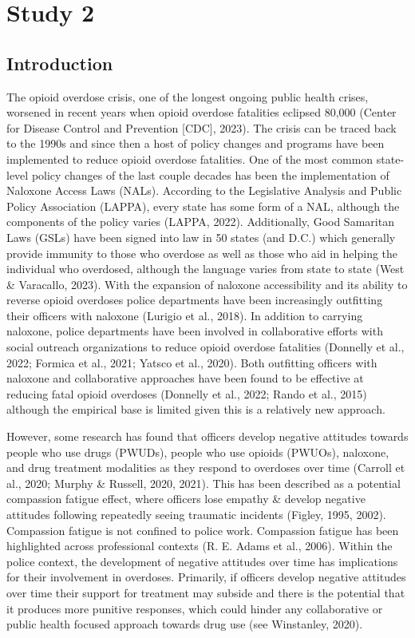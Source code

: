 \chapter{Study 2}

\section{Introduction}

The opioid overdose crisis, one of the longest ongoing public health crises, worsened in recent years when opioid overdose fatalities eclipsed 80,000 (Center for Disease Control and Prevention [CDC], 2023). The crisis can be traced back to the 1990s and since then a host of policy changes and programs have been implemented to reduce opioid overdose fatalities. One of the most common state-level policy changes of the last couple decades has been the implementation of Naloxone Access Laws (NALs). According to the Legislative Analysis and Public Policy Association (LAPPA), every state has some form of a NAL, although the components of the policy varies (LAPPA, 2022). Additionally, Good Samaritan Laws (GSLs) have been signed into law in 50 states (and D.C.) which generally provide immunity to those who overdose as well as those who aid in helping the individual who overdosed, although the language varies from state to state (West \& Varacallo, 2023). With the expansion of naloxone accessibility and its ability to reverse opioid overdoses police departments have been increasingly outfitting their officers with naloxone (Lurigio et al., 2018). In addition to carrying naloxone, police departments have been involved in collaborative efforts with social outreach organizations to reduce opioid overdose fatalities (Donnelly et al., 2022; Formica et al., 2021; Yatsco et al., 2020). Both outfitting officers with naloxone and collaborative approaches have been found to be effective at reducing fatal opioid overdoses (Donnelly et al., 2022; Rando et al., 2015) although the empirical base is limited given this is a relatively new approach.

However, some research has found that officers develop negative attitudes towards people who use drugs (PWUDs), people who use opioids (PWUOs), naloxone, and drug treatment modalities as they respond to overdoses over time (Carroll et al., 2020; Murphy \& Russell, 2020, 2021). This has been described as a potential compassion fatigue effect, where officers lose empathy \& develop negative attitudes following repeatedly seeing traumatic incidents (Figley, 1995, 2002). Compassion fatigue is not confined to police work. Compassion fatigue has been highlighted across professional contexts (R. E. Adams et al., 2006). Within the police context, the development of negative attitudes over time has implications for their involvement in overdoses. Primarily, if officers develop negative attitudes over time their support for treatment may subside and there is the potential that it produces more punitive responses, which could hinder any collaborative or public health focused approach towards drug use (see Winstanley, 2020).

